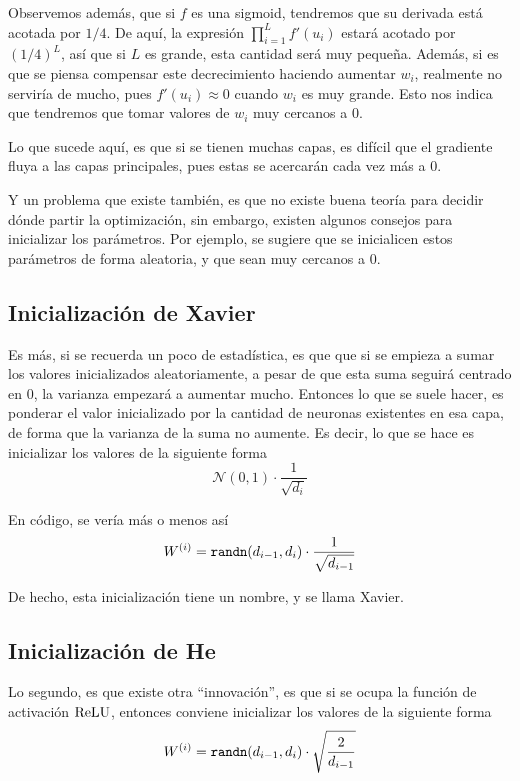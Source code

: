 Observemos además, que si $f$ es una sigmoid, tendremos que su derivada está acotada por $1/4$. De aquí, la expresión $\prod_{i=1}^{L}f'(u_i)$ estará acotado por $(1/4)^{L}$, así que si $L$ es grande, esta cantidad será muy pequeña. Además, si es que se piensa compensar este decrecimiento haciendo aumentar $w_i$, realmente no serviría de mucho, pues $f'(u_i) \approx 0$ cuando $w_i$ es muy grande. Esto nos indica que tendremos que tomar valores de $w_i$ muy cercanos a $0$.

Lo que sucede aquí, es que si se tienen muchas capas, es difícil que el gradiente fluya a las capas principales, pues estas se acercarán cada vez más a $0$. 

Y un problema que existe también, es que no existe buena teoría para decidir dónde partir la optimización, sin embargo, existen algunos consejos para inicializar los parámetros. Por ejemplo, se sugiere que se inicialicen estos parámetros de forma aleatoria, y que sean muy cercanos a $0$.

\subsection{Inicialización de Xavier}

Es más, si se recuerda un poco de estadística, es que que si se empieza a sumar los valores inicializados aleatoriamente, a pesar de que esta suma seguirá centrado en 0, la varianza empezará a aumentar mucho. Entonces lo que se suele hacer, es ponderar el valor inicializado por la cantidad de neuronas existentes en esa capa, de forma que la varianza de la suma no aumente. Es decir, lo que se hace es inicializar los valores de la siguiente forma
\begin{equation*}
    \mathcal{N}(0, 1) \cdot \frac{1}{\sqrt{d_i}}
\end{equation*}

En código, se vería más o menos así
\begin{equation*}
    W^{(i)} = \text{\texttt{randn}}(d_{i-1}, d_i) \cdot \frac{1}{\sqrt{d_{i-1}}}
\end{equation*}

De hecho, esta inicialización tiene un nombre, y se llama Xavier.

\subsection{Inicialización de He}

Lo segundo, es que existe otra ``innovación'', es que si se ocupa la función de activación $\operatorname{ReLU}$, entonces conviene inicializar los valores de la siguiente forma
\begin{equation*}
    W^{(i)} = \text{\texttt{randn}}(d_{i-1}, d_i) \cdot \sqrt{\frac{2}{d_{i-1}}}
\end{equation*}

